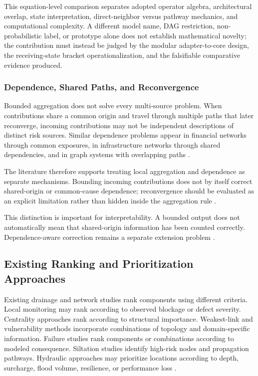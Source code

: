 This equation-level comparison separates adopted operator algebra,
architectural overlap, state interpretation, direct-neighbor versus
pathway mechanics, and computational complexity. A different model name,
DAG restriction, non-probabilistic label, or prototype alone does not
establish mathematical novelty; the contribution must instead be judged
by the modular adapter-to-core design, the receiving-state bracket
operationalization, and the falsifiable comparative evidence produced.



\subsubsection{Dependence, Shared Paths, and
Reconvergence}\label{dependence-shared-paths-and-reconvergence}

Bounded aggregation does not solve every multi-source problem. When
contributions share a common origin and travel through multiple paths
that later reconverge, incoming contributions may not be independent
descriptions of distinct risk sources. Similar dependence problems
appear in financial networks through common exposures, in infrastructure
networks through shared dependencies, and in graph systems with
overlapping paths \citep{buldyrev2010,faraji2026,zhou2023}.

The literature therefore supports treating local aggregation and
dependence as separate mechanisms. Bounding incoming contributions does
not by itself correct shared-origin or common-cause dependence;
reconvergence should be evaluated as an explicit limitation rather than
hidden inside the aggregation rule \citep{buldyrev2010,faraji2026}.

This distinction is important for interpretability. A bounded output
does not automatically mean that shared-origin information has been
counted correctly. Dependence-aware correction remains a separate
extension problem \citep{munoz2017,faraji2026}.

\subsection{Existing Ranking and Prioritization
Approaches}\label{existing-ranking-and-prioritization-approaches}

Existing drainage and network studies rank components using different
criteria. Local monitoring may rank according to observed blockage or
defect severity. Centrality approaches rank according to structural
importance. Weakest-link and vulnerability methods incorporate
combinations of topology and domain-specific information. Failure
studies rank components or combinations according to modeled
consequence. Siltation studies identify high-risk nodes and propagation
pathways. Hydraulic approaches may prioritize locations according to
depth, surcharge, flood volume, resilience, or performance loss
\citep{iqbal2021,vandaele2024,simone2022,dastgir2023,dastgir2024,
meijer2023,zhang2025}.

